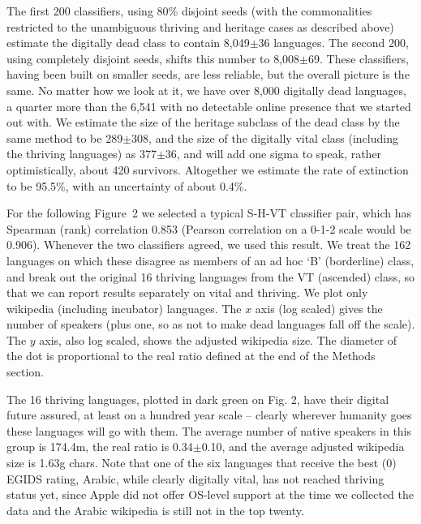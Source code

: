 \documentclass[10pt]{article}
\begin{document}
The first 200 classifiers, using 80\% disjoint seeds (with the commonalities
restricted to the unambiguous thriving and heritage cases as described above)
estimate the digitally dead class to contain 8,049$\pm$36 languages. The
second 200, using completely disjoint seeds, shifts this number to
8,008$\pm$69.  These classifiers, having been built on smaller seeds, are less
reliable, but the overall picture is the same. No matter how we look at it, we
have over 8,000 digitally dead languages, a quarter more than the 6,541 with
no detectable online presence that we started out with.  We estimate the size
of the heritage subclass of the dead class by the same method to be
289$\pm$308, and the size of the digitally vital class (including the
thriving languages) as 377$\pm$36, and will add one sigma to speak, rather
optimistically, about 420 survivors.  Altogether we estimate the rate of
extinction to be 95.5\%, with an uncertainty of about 0.4\%.

For the following Figure~2 we selected a typical S-H-VT classifier pair, which
has Spearman (rank) correlation 0.853 (Pearson correlation on a 0-1-2 scale
would be 0.906). Whenever the two classifiers agreed, we used this result.  We
treat the 162 languages on which these disagree as members of an ad hoc `B'
(borderline) class, and break out the original 16 thriving languages from the
VT (ascended) class, so that we can report results separately on vital and
thriving. We plot only wikipedia (including incubator) languages. The $x$ axis
(log scaled) gives the number of speakers (plus one, so as not to make dead
languages fall off the scale). The $y$ axis, also log scaled, shows the
adjusted wikipedia size. The diameter of the dot is proportional to the real
ratio defined at the end of the Methods section.


\medskip
The 16 thriving languages, plotted in dark green on Fig. 2, have their
digital future assured, at least on a hundred year scale -- clearly wherever
humanity goes these languages will go with them. The average number of native
speakers in this group is 174.4m, the real ratio is 0.34$\pm$0.10, and the
average adjusted wikipedia size is 1.63g chars. Note that one of the six
languages that receive the best (0) EGIDS rating, Arabic, while clearly
digitally vital, has not reached thriving status yet, since Apple did not
offer OS-level support at the time we collected the data and the Arabic
wikipedia is still not in the top twenty. 
\end{document}
